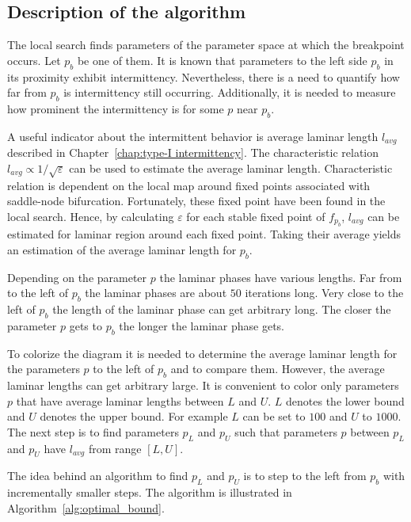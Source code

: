 \subsection{Description of the algorithm}
The local search finds parameters of the parameter space at which the breakpoint occurs.
Let $p_b$ be one of them.
It is known that parameters to the left side $p_b$ in its proximity exhibit intermittency.
Nevertheless, there is a need to quantify how far from $p_b$ is intermittency still occurring.
Additionally, it is needed to measure how prominent the intermittency is for some $p$ near $p_b$.
\par
A useful indicator about the intermittent behavior is average laminar length $l_{avg}$ described in Chapter~\ref{chap:type-I intermittency}.
The characteristic relation $l_{avg} \varpropto 1 / \sqrt{\varepsilon}$ can be used to estimate the average laminar length.
Characteristic relation is dependent on the local map around fixed points associated with saddle-node bifurcation.
Fortunately, these fixed point have been found in the local search.
Hence, by calculating $\varepsilon$ for each stable fixed point of $f_{p_b}$, $l_{avg}$ can be estimated for laminar region around each fixed point.
Taking their average yields an estimation of the average laminar length for $p_b$.
\par
Depending on the parameter $p$ the laminar phases have various lengths.
Far from to the left of $p_b$ the laminar phases are about $50$ iterations long.
Very close to the left of $p_b$ the length of the laminar phase can get arbitrary long.
The closer the parameter $p$ gets to $p_b$ the longer the laminar phase gets.
\par
To colorize the diagram it is needed to determine the average laminar length for the parameters $p$ to the left of $p_b$ and to compare them.
However, the average laminar lengths can get arbitrary large.
It is convenient to color only parameters $p$ that have average laminar lengths between $L$ and $U$. 
$L$ denotes the lower bound and $U$ denotes the upper bound.
For example $L$ can be set to $100$ and $U$ to $1000$.
The next step is to find parameters $p_L$ and $p_U$ such that parameters $p$ between $p_L$ and $p_U$ have $l_{avg}$ from range $[ L, U ]$.
\par
The idea behind an algorithm to find $p_L$ and $p_U$ is to step to the left from $p_b$ with incrementally smaller steps.
The algorithm is illustrated in Algorithm~\ref{alg:optimal_bound}.

